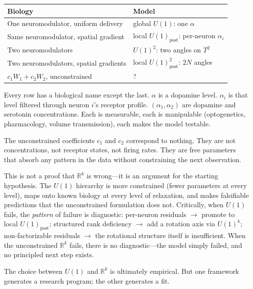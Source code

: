 \documentclass[11pt]{article}
\begin{document}
\begin{center}
\renewcommand{\arraystretch}{1.3}
\begin{tabular}{@{}ll@{}}
\toprule
\textbf{Biology} & \textbf{Model} \\
\midrule
One neuromodulator, uniform delivery & 
global $U(1)$: one $\alpha$ \\
Same neuromodulator, spatial gradient & 
local $U(1)_{\text{post}}$: per-neuron $\alpha_i$ \\
Two neuromodulators & 
$U(1)^2$: two angles on $T^2$ \\
Two neuromodulators, spatial gradients & 
local $U(1)^2_{\text{post}}$: $2N$ angles \\[3pt]
$c_1 W_1 + c_2 W_2$, unconstrained & ? \\
\bottomrule
\end{tabular}
\end{center}

Every row has a biological name except the last. $\alpha$ is a 
dopamine level. $\alpha_i$ is that level filtered through neuron 
$i$'s receptor profile. $(\alpha_1, \alpha_2)$ are dopamine and 
serotonin concentrations. Each is measurable, each is manipulable 
(optogenetics, pharmacology, volume transmission), each makes the 
model testable.

The unconstrained coefficients $c_1$ and $c_2$ correspond to 
nothing. They are not concentrations, not receptor states, not 
firing rates. They are free parameters that absorb any pattern 
in the data without constraining the next observation.

This is not a proof that $\mathbb{R}^k$ is wrong---it is an argument 
for the starting hypothesis. The $U(1)$ hierarchy is more 
constrained (fewer parameters at every level), maps onto known 
biology at every level of relaxation, and makes falsifiable 
predictions that the unconstrained formulation does not. 
Critically, when $U(1)$ fails, the \emph{pattern} of failure 
is diagnostic: per-neuron residuals $\to$ promote to local 
$U(1)_{\text{post}}$; structured rank deficiency $\to$ add 
a rotation axis via $U(1)^k$; non-factorizable residuals $\to$ 
the rotational structure itself is insufficient. When the 
unconstrained $\mathbb{R}^k$ fails, there is no diagnostic---the model 
simply failed, and no principled next step exists.

The choice between $U(1)$ and $\mathbb{R}^k$ is ultimately empirical. 
But one framework generates a research program; the other 
generates a fit.
\end{document}
